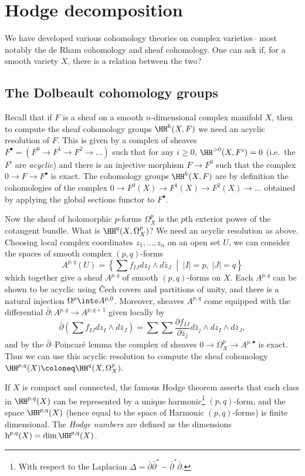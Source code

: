 \section{Hodge decomposition}
We have developed various cohomology theories on complex varieties-- most
notably the de Rham cohomology and sheaf cohomology. One can ask if, for a
smooth variety \(X\), there is a relation between the two?

\subsection{The Dolbeault cohomology groups}
Recall that if \(F\) is a sheaf on a smooth \(n\)-dimensional complex manifold
\(X\), then to compute the sheaf cohomology groups \(\HH^k(X,F)\) we need an
acyclic resolution of \(F\). This is given by a complex of sheaves \(F^\bullet =
(F^0\to F^1\to F^2\to ...)\) such that for any \(i\geq 0\),
\(\HH^{>0}(X,F^i)=0\) (i.e.\ the \(F^i\) are \textit{acyclic}) and there is an
injective morphism \(F\to F^0\) such that the complex \(0\to F \to F^\bullet\)
is exact. The cohomology groups \(\HH^k(X,F)\) are by definition the cohomologies of the complex \(0\to F^0(X)\to F^1(X)\to F^2(X)\to... \) obtained by applying the global sections functor to \(F^\bullet\).

Now the sheaf of holomorphic \(p\)-forms \(\Omega^p_X\) is the \(p\)th exterior
power of the cotangent bundle. What is \(\HH^q(X,\Omega_X^p)\)? We need an
acyclic resolution as above. Choosing local complex coordinates \(z_1,...,z_n\)
on an open set \(U\), we can consider the spaces of smooth complex \((p,q)\)-forms
\[A^{p,q}(U)=\left\{\sum f_{IJ}dz_I\wedge d\bar{z}_J\;\middle|\; |I|=p,\; |J|=q\right\}\]
which together give a sheaf \(A^{p,q}\) of smooth \((p,q)\)-forms on \(X\). Each
\(A^{p,q}\) can be shown to be acyclic using \v{C}ech covers and partitions of
unity, and there is a natural injection \(\Omega^p\into A^{p,0}\). Moreover, sheaves \(A^{p,q}\) come equipped with the differential
\(\bar\partial:A^{p,q}\to A^{p,q+1}\) given locally by \[\bar\partial \left(\sum f_{IJ}dz_I\wedge
d\bar{z}_J\right) = \sum \sum \frac{\partial f_{IJ}}{\partial \bar{z}_j} d
\bar{z}_j\wedge dz_I \wedge d\bar{z}_J,\] and by the
\(\bar\partial\)--Poincar\'e lemma the complex of sheaves
\(0\to \Omega^p_X\to A^{p,\bullet}\) is exact. Thus we can use this acyclic resolution to compute the sheaf cohomology
\(\HH^{p,q}(X)\coloneq \HH^q(X,\Omega^p_X).\)

If \(X\) is compact and connected, the famous Hodge theorem asserts that each
class in \(\HH^{p,q}(X)\) can be represented by a unique harmonic\footnote{With
respect to the Laplacian \(\Delta=\bar\partial \bar\partial^\ast - \bar\partial^
\ast \bar\partial\).} \((p,q)\)-form, and the space \(\HH^{p,q}(X)\) (hence equal to the space of Harmonic \((p,q)\)-forms) is finite dimensional. The \textit{Hodge numbers} are defined as the dimensions \(\text{h}^{p,q}(X)=\dim \HH^{p,q}(X)\).

